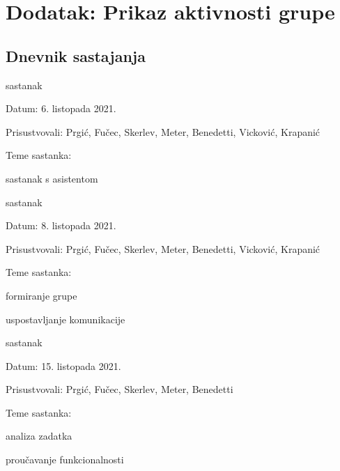 \chapter*{Dodatak: Prikaz aktivnosti grupe}
		
		\section*{Dnevnik sastajanja}
		\def\prg{Prgić}
		\def\fuc{Fučec}
		\def\ske{Skerlev}
		\def\met{Meter}
		\def\ben{Benedetti}
		\def\vic{Vicković}
		\def\kra{Krapanić}
		
		
		\begin{packed_enum}
			\item  sastanak
			
			\item[] \begin{packed_item}
				\item Datum: 6. listopada 2021. 
				\item Prisustvovali: \prg, \fuc, \ske, \met, \ben, \vic, \kra
				\item Teme sastanka:
				\begin{packed_item}
					\item  sastanak s asistentom
				\end{packed_item}
			\end{packed_item}
		
			\item  sastanak
			\item[] \begin{packed_item}
				\item Datum: 8. listopada 2021.
				\item Prisustvovali: \prg, \fuc, \ske, \met, \ben, \vic, \kra
				\item Teme sastanka:
				\begin{packed_item}
					\item  formiranje grupe 
					\item  uspostavljanje komunikacije
				\end{packed_item}
			\end{packed_item}
			
			\item  sastanak
			\item[] \begin{packed_item}
				\item Datum: 15. listopada 2021. 
				\item Prisustvovali: \prg, \fuc, \ske, \met, \ben
				\item Teme sastanka:
				\begin{packed_item}
					\item  analiza zadatka
					\item  proučavanje funkcionalnosti 
				\end{packed_item}
			\end{packed_item}
			

\end{packed_enum}
